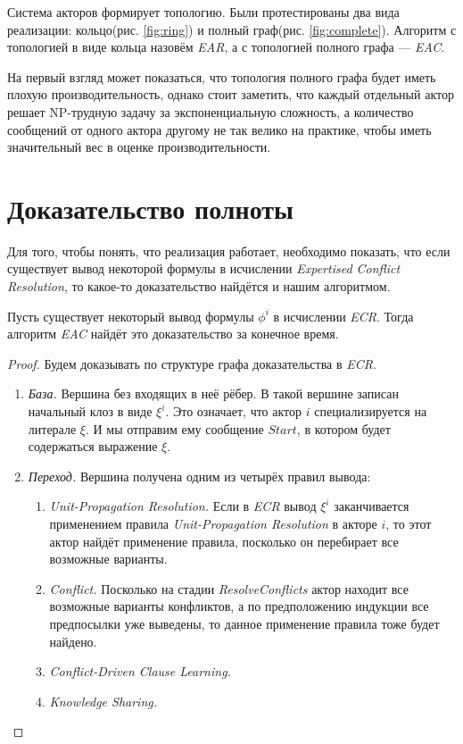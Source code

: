 Система акторов формирует топологию. Были протестированы два вида реализации: кольцо(рис. \ref{fig:ring}) и полный граф(рис. \ref{fig:complete}). Алгоритм с топологией в виде кольца назовём \emph{EAR}, а с топологией полного графа --- \emph{EAC}. 

На первый взгляд может показаться, что топология полного графа будет иметь плохую производительность, однако стоит заметить, что каждый отдельный актор решает NP-трудную задачу за экспоненциальную сложность, а количество сообщений от одного актора другому не так велико на практике, чтобы иметь значительный вес в оценке производительности.

\section{Доказательство полноты}
Для того, чтобы понять, что реализация работает, необходимо показать, что если существует вывод некоторой формулы в исчислении \emph{Expertised Conflict Resolution}, то какое-то доказательство найдётся и нашим алгоритмом. 

\begin{theorem}
Пусть существует некоторый вывод формулы $\phi^i$ в исчислении \emph{ECR}. Тогда алгоритм \emph{EAC} найдёт это доказательство за конечное время.
\end{theorem}
\begin{proof}
Будем доказывать по структуре графа доказательства в \emph{ECR}.
\begin{enumerate}[label=$\star$]
	\item \emph{База.} Вершина без входящих в неё рёбер. В такой вершине записан начальный клоз в виде $\xi^i$. Это означает, что актор $i$ специализируется на литерале $\xi$. И мы отправим ему сообщение $Start$, в котором будет содержаться выражение $\xi$.
    \item \emph{Переход.} Вершина получена одним из четырёх правил вывода: 
    \begin{enumerate}
      \item \emph{Unit-Propagation Resolution.} Если в \emph{ECR} вывод $\xi^i$ заканчивается применением правила \emph{Unit-Propagation Resolution} в акторе $i$, то этот актор найдёт применение правила, посколько он перебирает все возможные варианты. 
      \item \emph{Conflict.} Посколько на стадии \emph{ResolveConflicts} актор находит все возможные варианты конфликтов, а по предположению индукции все предпосылки уже выведены, то данное применение правила тоже будет найдено.
      \item \emph{Conflict-Driven Clause Learning.}
      \item \emph{Knowledge Sharing.}
    \end{enumerate}
\end{enumerate}
\end{proof}

